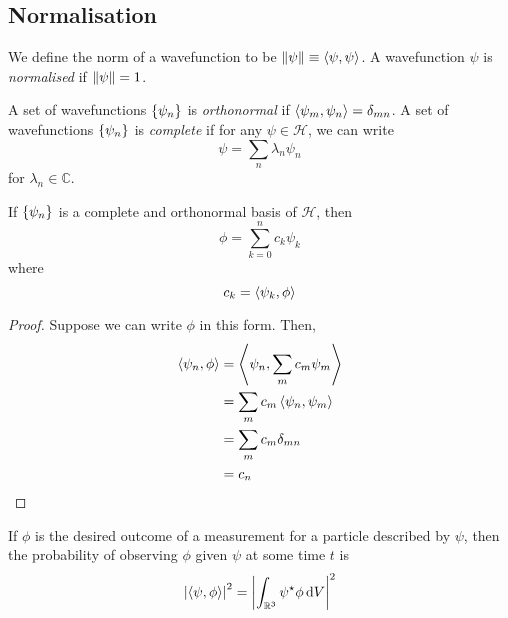 \subsection{Normalisation}
\begin{definition}
	We define the norm of a wavefunction to be \( \norm{\psi} \equiv \left\langle{\psi,\psi}\right\rangle \).
	A wavefunction \( \psi \) is \textit{normalised} if \( \norm{\psi} = 1 \).
\end{definition}
\begin{definition}
	A set of wavefunctions \( \qty{\psi_n} \) is \textit{orthonormal} if \( \left\langle{\psi_m, \psi_n}\right\rangle = \delta_{mn} \).
	A set of wavefunctions \( \qty{\psi_n} \) is \textit{complete} if for any \( \psi \in \mathcal H \), we can write
	\[
		\psi = \sum_n \lambda_n \psi_n
	\]
	for \( \lambda_n \in \mathbb C \).
\end{definition}
\begin{proposition}
	If \( \qty{\psi_n} \) is a complete and orthonormal basis of \( \mathcal H \), then
	\[
		\phi = \sum_{k=0}^n c_k \psi_k
	\]
	where
	\[
		c_k = \left\langle{\psi_k, \phi}\right\rangle
	\]
\end{proposition}
\begin{proof}
	Suppose we can write \( \phi \) in this form.
	Then,
	\begin{align*}
		\left\langle{\psi_n, \phi}\right\rangle & = \left\langle{\psi_n, \sum_m c_m \psi_m}\right\rangle \\
		                     & = \sum_m c_m \left\langle{\psi_n, \psi_m}\right\rangle \\
		                     & = \sum_m c_m \delta_{mn}             \\
		                     & = c_n
	\end{align*}
\end{proof}
\begin{remark}
	If \( \phi \) is the desired outcome of a measurement for a particle described by \( \psi \), then the probability of observing \( \phi \) given \( \psi \) at some time \( t \) is
	\[
		\abs{\left\langle{\psi, \phi}\right\rangle}^2 = \abs{\int_{\mathbb R^3} \psi^\star \phi \dd{V}}^2
	\]
\end{remark}

